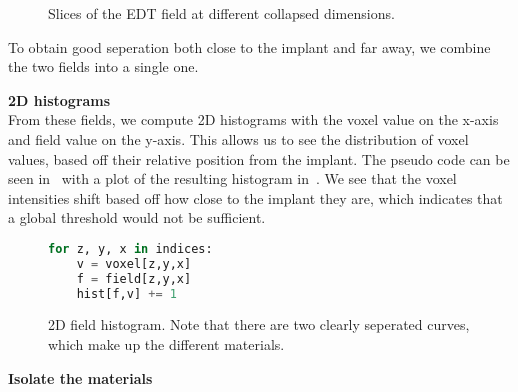 \begin{figure}
    \caption{Slices of the EDT field at different collapsed dimensions.}
    \label{fig:field-slices}
\end{figure}

To obtain good seperation both close to the implant and far away, we combine the two fields into a single one.


\vspace{\baselineskip}
\noindent\textbf{2D histograms} \\

From these fields, we compute 2D histograms with the voxel value on the x-axis and field value on the y-axis.
This allows us to see the distribution of voxel values, based off their relative position from the implant.
The pseudo code can be seen in~ with a plot of the resulting histogram in~.
We see that the voxel intensities shift based off how close to the implant they are, which indicates that a global threshold would not be sufficient.

\begin{figure}
    \begin{lstlisting}[language=Python,caption=Python-like pseudo code for computing the 2D field histograms.,label=lis:field-hist]
for z, y, x in indices:
    v = voxel[z,y,x]
    f = field[z,y,x]
    hist[f,v] += 1
    \end{lstlisting}
\end{figure}

\begin{figure}
    \caption{2D field histogram. Note that there are two clearly seperated curves, which make up the different materials.}
    \label{fig:field-hist}
\end{figure}

\vspace{\baselineskip}
\noindent\textbf{Isolate the materials} \\

